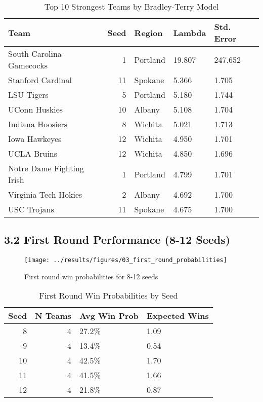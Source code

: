 \documentclass[
]{article}
\begin{document}
\begin{longtable}[t]{lrlll}
\caption{\label{tab:top-teams}Top 10 Strongest Teams by Bradley-Terry Model}\\
\toprule
Team & Seed & Region & Lambda & Std. Error\\
\midrule
South Carolina Gamecocks & 1 & Portland & 19.807 & 247.652\\
Stanford Cardinal & 11 & Spokane & 5.366 & 1.705\\
LSU Tigers & 5 & Portland & 5.180 & 1.744\\
UConn Huskies & 10 & Albany & 5.108 & 1.704\\
Indiana Hoosiers & 8 & Wichita & 5.021 & 1.713\\
\addlinespace
Iowa Hawkeyes & 12 & Wichita & 4.950 & 1.701\\
UCLA Bruins & 12 & Wichita & 4.850 & 1.696\\
Notre Dame Fighting Irish & 1 & Portland & 4.799 & 1.701\\
Virginia Tech Hokies & 2 & Albany & 4.692 & 1.700\\
USC Trojans & 11 & Spokane & 4.675 & 1.700\\
\bottomrule
\end{longtable}

\subsection{3.2 First Round Performance (8-12
Seeds)}\label{first-round-performance-8-12-seeds}

\begin{figure}

{\centering \texttt{[image: ../results/figures/03\_first\_round\_probabilities]} 

}

\caption{First round win probabilities for 8-12 seeds}\label{fig:first-round-plot}
\end{figure}

\begin{longtable}[t]{rrll}
\caption{\label{tab:first-round-table}First Round Win Probabilities by Seed}\\
\toprule
Seed & N Teams & Avg Win Prob & Expected Wins\\
\midrule
8 & 4 & 27.2\% & 1.09\\
9 & 4 & 13.4\% & 0.54\\
10 & 4 & 42.5\% & 1.70\\
11 & 4 & 41.5\% & 1.66\\
12 & 4 & 21.8\% & 0.87\\
\bottomrule
\end{longtable}
\end{document}
